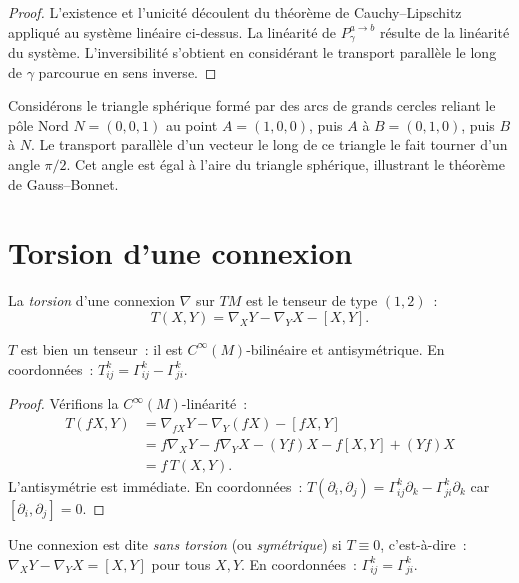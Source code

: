 \begin{proof}
L'existence et l'unicit\'e d\'ecoulent du th\'eor\`eme de Cauchy--Lipschitz
appliqu\'e au syst\`eme lin\'eaire ci-dessus. La lin\'earit\'e de $P_\gamma^{a \to b}$
r\'esulte de la lin\'earit\'e du syst\`eme. L'inversibilit\'e s'obtient en consid\'erant
le transport parall\`ele le long de $\gamma$ parcourue en sens inverse.
\end{proof}

\begin{exemple}
Consid\'erons le triangle sph\'erique form\'e par des arcs de grands cercles reliant
le p\^ole Nord $N = (0,0,1)$ au point $A = (1,0,0)$, puis $A$ \`a $B = (0,1,0)$,
puis $B$ \`a $N$. Le transport parall\`ele d'un vecteur le long de ce triangle
le fait tourner d'un angle $\pi/2$. Cet angle est \'egal \`a l'aire du triangle
sph\'erique, illustrant le th\'eor\`eme de Gauss--Bonnet.
\end{exemple}

\section{Torsion d'une connexion}

\begin{definition}
La \emph{torsion} d'une connexion $\nabla$ sur $TM$ est le tenseur de type $(1,2)$~:
\[
    T(X, Y) = \nabla_X Y - \nabla_Y X - [X, Y].
\]
\end{definition}

\begin{proposition}
$T$ est bien un tenseur~: il est $C^\infty(M)$-bilin\'eaire et antisym\'etrique.
En coordonn\'ees~: $T^k_{ij} = \Gamma^k_{ij} - \Gamma^k_{ji}$.
\end{proposition}

\begin{proof}
V\'erifions la $C^\infty(M)$-lin\'earit\'e~:
\begin{align*}
    T(fX, Y) &= \nabla_{fX} Y - \nabla_Y(fX) - [fX, Y] \\
    &= f\nabla_X Y - f\nabla_Y X - (Yf)X - f[X,Y] + (Yf)X \\
    &= f\, T(X, Y).
\end{align*}
L'antisym\'etrie est imm\'ediate. En coordonn\'ees~:
$T(\partial_i, \partial_j) = \Gamma^k_{ij}\partial_k - \Gamma^k_{ji}\partial_k$
car $[\partial_i, \partial_j] = 0$.
\end{proof}

\begin{definition}
Une connexion est dite \emph{sans torsion} (ou \emph{sym\'etrique}) si $T \equiv 0$,
c'est-\`a-dire~: $\nabla_X Y - \nabla_Y X = [X, Y]$ pour tous $X, Y$.
En coordonn\'ees~: $\Gamma^k_{ij} = \Gamma^k_{ji}$.
\end{definition}

